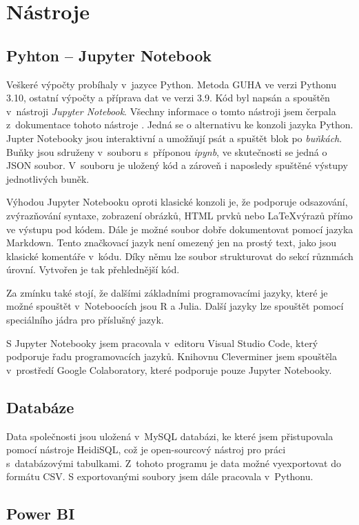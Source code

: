 \section{Nástroje}

\subsection{Pyhton -- Jupyter Notebook}
Veškeré výpočty probíhaly v~jazyce Python. Metoda GUHA ve verzi Pythonu 3.10, ostatní výpočty a příprava dat ve verzi 3.9. Kód byl napsán a spouštěn v~nástroji\emph{ Jupyter Notebook}. Všechny informace o tomto nástroji jsem čerpala z~dokumentace tohoto nástroje \cite{bib:JN}. Jedná se o alternativu ke konzoli jazyka Python. Jupter Notebooky jsou interaktivní a umožňují psát a spuštět blok po \emph{buňkách}. Buňky jsou sdruženy v~souboru s~příponou \emph{ipynb}, ve skutečnosti se jedná o JSON soubor. V~souboru je uložený kód a zároveň i naposledy spuštěné výstupy jednotlivých buněk. 

Výhodou Jupyter Notebooku oproti klasické konzoli je, že podporuje odsazování, zvýrazňování syntaxe, zobrazení obrázků, HTML prvků nebo \LaTeX výrazů přímo ve výstupu pod kódem. Dále je možné soubor dobře dokumentovat pomocí jazyka Markdown. Tento značkovací jazyk není omezený jen na prostý text, jako jsou klasické komentáře v~kódu. Díky němu lze soubor strukturovat do sekcí různmách úrovní. Vytvořen je tak přehlednější kód. 

Za zmínku také stojí, že dalšími základními programovacími jazyky, které je možné spouštět v~Noteboocích jsou R a Julia. Další jazyky lze spouštět pomocí speciálního jádra pro příslušný jazyk.

S Jupyter Notebooky jsem pracovala v~editoru Visual Studio Code, který podporuje řadu programovacích jazyků. Knihovnu Cleverminer jsem spouštěla v~prostředí Google Colaboratory, které podporuje pouze Jupyter Notebooky.

\subsection*{Databáze}
Data společnosti jsou uložená v~MySQL databázi, ke které jsem přistupovala pomocí nástroje HeidiSQL, což je open-sourcový nástroj pro práci s~databázovými tabulkami. Z~tohoto programu je data možné vyexportovat do formátu CSV. S exportovanými soubory jsem dále pracovala v~Pythonu.

\subsection{Power BI}
\label{sec:PBI}

